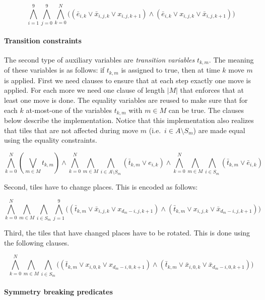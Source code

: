 \documentclass[]{llncs}
\begin{document}
\begin{equation}
\bigwedge_{i=1}^9 \bigwedge_{j=0}^9 \bigwedge_{k=0}^{N} \big( (\bar e_{i,k} \lor \bar x_{i,j,k} \lor x_{i,j,k+1}) \land (\bar e_{i,k} \lor x_{i,j,k} \lor \bar x_{i,j,k+1}) \big )
\end{equation}

\paragraph{Transition constraints} The second type of auxiliary variables are {\em transition variables} $t_{k,m}$.
The meaning of these variables is as follows: if $t_{k,m}$ is assigned to true, then at time $k$ move $m$ is applied.
First we need clauses to ensure that at each step exactly one move is applied. For each more we need one clause of
length $|M|$ that enforces that at least one move is done. The equality variables are reused to make sure that for each $k$
at-most-one of the variables $t_{k,m}$ with $m \in M$ can be true. The clauses below describe the implementation.
Notice that this implementation also realizes that tiles that are not affected during move $m$ (i.e.\ $i \in A \setminus S_m$)
are made equal using the equality constraints.

\begin{equation}
\bigwedge_{k=0}^{N} (\bigvee_{m \in M} t_{k,m}) \land \bigwedge_{k=0}^{N} \bigwedge_{m \in M} \bigwedge_{i \in A \setminus S_m} (\bar t_{k,m} \lor e_{i,k}) \land
 \bigwedge_{k=0}^{N} \bigwedge_{m \in M} \bigwedge_{i \in S_m} (\bar t_{k,m} \lor \bar e_{i,k})
\end{equation}

Second, tiles have to change places. This is encoded as follows:

\begin{equation}
\bigwedge_{k=0}^{N} \bigwedge_{m \in M} \bigwedge_{i \in S_m} \bigwedge_{j=1}^9 \big( (\bar t_{k,m} \lor \bar x_{i,j,k} \lor x_{d_m - i,j,k + 1} ) \land (\bar t_{k,m} \lor x_{i,j,k} \lor \bar x_{d_m - i,j,k + 1} ) \big)
\end{equation}

Third, the tiles that have changed places have to be rotated. This is done using the following clauses.

\begin{equation}
\bigwedge_{k=0}^{N} \bigwedge_{m \in M} \bigwedge_{i \in S_m} \big( (\bar t_{k,m} \lor x_{i,0,k} \lor x_{d_m - i,0,k + 1} ) \land (\bar t_{k,m} \lor \bar x_{i,0,k} \lor \bar x_{d_m - i,0,k + 1} ) \big)
\end{equation}


\paragraph{Symmetry breaking predicates}
\end{document}

